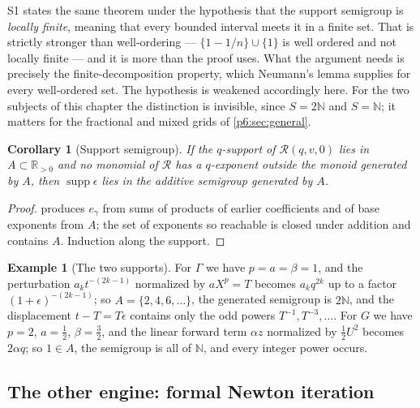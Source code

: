 \documentclass[11pt,a4paper,oneside]{book}
\theoremstyle{plain}
\newtheorem{corollary}[theorem]{Corollary}
\theoremstyle{definition}
\newtheorem{example}[theorem]{Example}
\theoremstyle{remark}
\newcommand{\Nat}{\mathbb{N}}
\newcommand{\Real}{\mathbb{R}}
\begin{document}
\begin{repairbox}
S1 states the same theorem under the hypothesis that the support semigroup is
\emph{locally finite}, meaning that every bounded interval meets it in a
finite set.  That is strictly stronger than well-ordering --- $\{1-1/n\}\cup
\{1\}$ is well ordered and not locally finite --- and it is more than the
proof uses.  What the argument needs is precisely the finite-decomposition
property, which Neumann's lemma supplies for every well-ordered set.  The
hypothesis is weakened accordingly here.  For the two subjects of this chapter
the distinction is invisible, since $S=2\Nat$ and $S=\Nat$; it matters for the
fractional and mixed grids of \cref{p6:sec:general}.
\end{repairbox}

\begin{corollary}[Support semigroup]\label{p6:cor:support}
If the $q$-support of $\mathcal{R}(q,v,0)$ lies in $A\subset\Real_{>0}$ and no
monomial of $\mathcal{R}$ has a $q$-exponent outside the monoid generated by $A$,
then $\operatorname{supp}\epsilon$ lies in the additive semigroup generated by
$A$.
\end{corollary}

\begin{proof}
 produces $e_\gamma$ from sums of products of earlier
coefficients and of base exponents from $A$; the set of exponents so reachable
is closed under addition and contains $A$.  Induction along the support.
\end{proof}

\begin{example}[The two supports]\label{p6:ex:supports}
For $\Gamma$ we have $p=a=\beta=1$, and the perturbation $a_kt^{-(2k-1)}$
normalized by $aX^{p}=T$ becomes $a_kq^{2k}$ up to a factor
$(1+\epsilon)^{-(2k-1)}$; so $A=\{2,4,6,\dots\}$, the generated semigroup is
$2\Nat$, and the displacement $t-T=T\epsilon$ contains only the odd powers
$T^{-1},T^{-3},\dots$.  For $G$ we have $p=2$, $a=\tfrac12$, $\beta=\tfrac32$,
and the linear forward term $\alpha z$ normalized by $\tfrac12U^{2}$ becomes
$2\alpha q$; so $1\in A$, the semigroup is all of $\Nat$, and every integer
power occurs.
\end{example}

\subsection{The other engine: formal Newton iteration}
\end{document}
